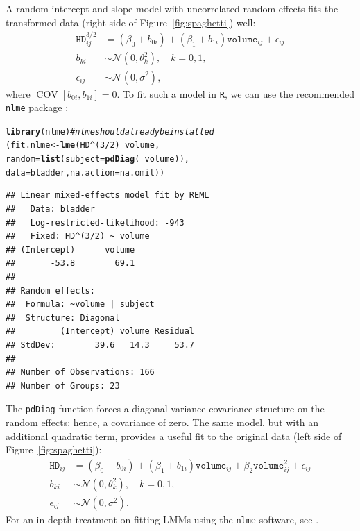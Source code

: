\documentclass{article}\usepackage[]{graphicx}\usepackage[]{color}
\makeatletter
\newcommand{\hlnum}[1]{\textcolor[rgb]{0.686,0.059,0.569}{#1}}%
\newcommand{\hlcom}[1]{\textcolor[rgb]{0.678,0.584,0.686}{\textit{#1}}}%
\newcommand{\hlopt}[1]{\textcolor[rgb]{0,0,0}{#1}}%
\newcommand{\hlstd}[1]{\textcolor[rgb]{0.345,0.345,0.345}{#1}}%
\newcommand{\hlkwb}[1]{\textcolor[rgb]{0.69,0.353,0.396}{#1}}%
\newcommand{\hlkwc}[1]{\textcolor[rgb]{0.333,0.667,0.333}{#1}}%
\newcommand{\hlkwd}[1]{\textcolor[rgb]{0.737,0.353,0.396}{\textbf{#1}}}%
\newenvironment{kframe}{%
 \def\at@end@of@kframe{}%
 \ifinner\ifhmode%
  \def\at@end@of@kframe{\end{minipage}}%
  \begin{minipage}{\columnwidth}%
 \fi\fi%
 \def\FrameCommand##1{\hskip\@totalleftmargin \hskip-\fboxsep
 \colorbox{shadecolor}{##1}\hskip-\fboxsep
     \hskip-\linewidth \hskip-\@totalleftmargin \hskip\columnwidth}%
 \MakeFramed {\advance\hsize-\width
   \@totalleftmargin\z@ \linewidth\hsize
   \@setminipage}}%
 {\par\unskip\endMakeFramed%
 \at@end@of@kframe}
\newenvironment{knitrout}{}{} %
\newcommand{\COV}{\operatorname{COV}}
\makeatother
\begin{document}
A random intercept and slope model with uncorrelated random effects fits the transformed data (right side of Figure~\ref{fig:spaghetti}) well:
\begin{align*}
  \texttt{HD}^{3/2}_{ij} &= \left(\beta_0 + b_{0i}\right) + \left(\beta_1 + b_{1i}\right)\texttt{volume}_{ij} + \epsilon_{ij} \\
  b_{ki} &\sim \mathcal{N}\left(0, \theta_k^2\right), \quad k = 0, 1, \\
  \epsilon_{ij} &\sim \mathcal{N}\left(0, \sigma^2\right),
\end{align*}
where $\COV\left[b_{0i}, b_{1i}\right] = 0$.  To fit such a model in \texttt{R}, we can use the recommended \texttt{nlme} package \citep{pinheiro-nlme-2013}:
\begin{knitrout}
\color{fgcolor}\begin{kframe}
\begin{alltt}
\hlkwd{library}\hlstd{(nlme)}  \hlcom{# nlme should already be installed}
\hlstd{(fit.nlme} \hlkwb{<-} \hlkwd{lme}\hlstd{(HD}\hlopt{^}\hlstd{(}\hlnum{3}\hlopt{/}\hlnum{2}\hlstd{)} \hlopt{~} \hlstd{volume,}
                 \hlkwc{random} \hlstd{=} \hlkwd{list}\hlstd{(}\hlkwc{subject} \hlstd{=} \hlkwd{pdDiag}\hlstd{(}\hlopt{~}\hlstd{volume)),}
                 \hlkwc{data} \hlstd{= bladder,} \hlkwc{na.action} \hlstd{= na.omit))}
\end{alltt}
\begin{verbatim}
## Linear mixed-effects model fit by REML
##   Data: bladder 
##   Log-restricted-likelihood: -943
##   Fixed: HD^(3/2) ~ volume 
## (Intercept)      volume 
##       -53.8        69.1 
## 
## Random effects:
##  Formula: ~volume | subject
##  Structure: Diagonal
##         (Intercept) volume Residual
## StdDev:        39.6   14.3     53.7
## 
## Number of Observations: 166
## Number of Groups: 23
\end{verbatim}
\end{kframe}
\end{knitrout}
The \texttt{pdDiag} function forces a diagonal variance-covariance structure on the random effects; hence, a covariance of zero. The same model, but with an additional quadratic term, provides a useful fit to the original data (left side of Figure~\ref{fig:spaghetti}):
\begin{align*}
  \texttt{HD}_{ij} &= \left(\beta_0 + b_{0i}\right) + \left(\beta_1 + b_{1i}\right)\texttt{volume}_{ij} + \beta_2\texttt{volume}_{ij}^2 + \epsilon_{ij} \\
  b_{ki} &\sim \mathcal{N}\left(0, \theta_k^2\right), \quad k = 0, 1, \\
  \epsilon_{ij} &\sim \mathcal{N}\left(0, \sigma^2\right).
\end{align*}
For an in-depth treatment on fitting LMMs using the \texttt{nlme} software, see \citet{pinheiro-mixed-2000}.
\end{document}
